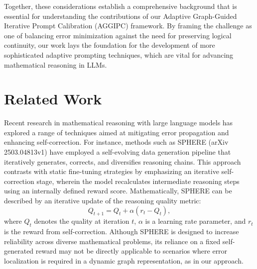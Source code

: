 \documentclass[11pt]{article}
\begin{document}
Together, these considerations establish a comprehensive background that is essential for understanding the contributions of our Adaptive Graph-Guided Iterative Prompt Calibration (AGGIPC) framework. By framing the challenge as one of balancing error minimization against the need for preserving logical continuity, our work lays the foundation for the development of more sophisticated adaptive prompting techniques, which are vital for advancing mathematical reasoning in LLMs.

\section{Related Work}
Recent research in mathematical reasoning with large language models has explored a range of techniques aimed at mitigating error propagation and enhancing self-correction. For instance, methods such as SPHERE (arXiv 2503.04813v1) have employed a self-evolving data generation pipeline that iteratively generates, corrects, and diversifies reasoning chains. This approach contrasts with static fine-tuning strategies by emphasizing an iterative self-correction stage, wherein the model recalculates intermediate reasoning steps using an internally defined reward score. Mathematically, SPHERE can be described by an iterative update of the reasoning quality metric:
\[
Q_{t+1} = Q_t + \alpha (r_t - Q_t),
\]
where \(Q_t\) denotes the quality at iteration \(t\), \(\alpha\) is a learning rate parameter, and \(r_t\) is the reward from self-correction. Although SPHERE is designed to increase reliability across diverse mathematical problems, its reliance on a fixed self-generated reward may not be directly applicable to scenarios where error localization is required in a dynamic graph representation, as in our approach.
\end{document}

